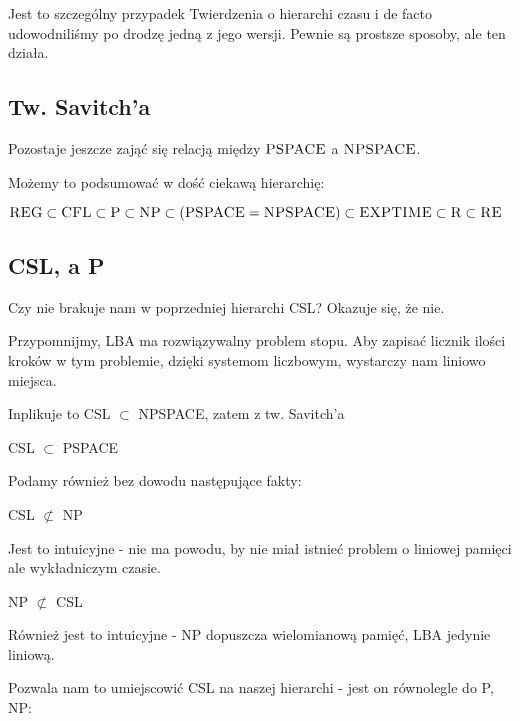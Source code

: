 Jest to szczególny przypadek Twierdzenia o hierarchi czasu i de facto udowodniliśmy po drodzę jedną z jego wersji. Pewnie są prostsze sposoby, ale ten działa.

\subsection{Tw. Savitch'a}

Pozostaje jeszcze zająć się relacją między \( \textsc{PSPACE}\) a \(\textsc{NPSPACE} \).



Możemy to podsumować w dość ciekawą hierarchię:

\begin{corollary}
	\( \textsc{REG} \subset \textsc{CFL} \subset \textsc{P} \subset \textsc{NP} \subset (\textsc{PSPACE} = \textsc{NPSPACE}) \subset \textsc{EXPTIME} \subset \textsc{R}
	\subset \textsc{RE} \)
\end{corollary}

\subsection{CSL, a P}

Czy nie brakuje nam w poprzedniej hierarchi CSL? Okazuje się, że nie.

Przypomnijmy, LBA ma rozwiązywalny problem stopu. Aby zapisać licznik ilości kroków w tym problemie, dzięki systemom liczbowym, wystarczy nam liniowo miejsca.

Inplikuje to CSL \(\subset\) NPSPACE, zatem z tw. Savitch'a

\begin{corollary}
	CSL \(\subset\) PSPACE
\end{corollary}

Podamy również bez dowodu następujące fakty:

\begin{lemma}
	CSL \( \not \subset \) NP
\end{lemma}

Jest to intuicyjne - nie ma powodu, by nie miał istnieć problem o liniowej pamięci ale wykładniczym czasie.

\begin{lemma}
	NP \( \not \subset \) CSL
\end{lemma}

Również jest to intuicyjne - NP dopuszcza wielomianową pamięć, LBA jedynie liniową.

Pozwala nam to umiejscowić CSL na naszej hierarchi - jest on równolegle do P, NP:

